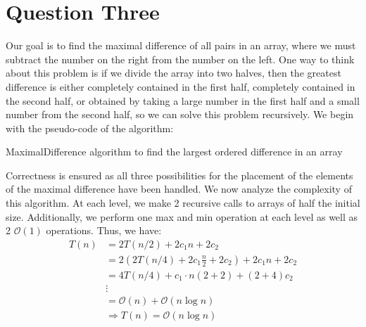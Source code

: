 \documentclass[11pt,letterpaper]{article}
\begin{document}
\section*{Question Three}
Our goal is to find the maximal difference of all pairs in an array, where we must subtract the number on the right from the number on the left. One way to think about this problem is if we divide the array into two halves, then the greatest difference is either completely contained in the first half, completely contained in the second half, or obtained by taking a large number in the first half and a small number from the second half, so we can solve this problem recursively. We begin with the pseudo-code of the algorithm:

\begin{algorithm}
	\caption{MaximalDifference algorithm to find the largest ordered difference in an array}
\end{algorithm}

Correctness is ensured as all three possibilities for the placement of the elements of the maximal difference have been handled. We now analyze the complexity of this algorithm. At each level, we make 2 recursive calls to arrays of half the initial size. Additionally, we perform one max and min operation at each level as well as 2 $\mathcal{O}(1)$ operations. Thus, we have:
\begin{align*}
	T(n) &= 2T(n/2) + 2 c_1 n + 2 c_2 \\
	&= 2(2T(n/4) + 2 c_1 \frac{n}{2} + 2 c_2) + 2 c_1 n + 2 c_2 \\
	&= 4 T(n/4) + c_1\cdot n (2 + 2) + (2 + 4)c_2 \\
	&\vdots \\
	&= \mathcal{O}(n) + \mathcal{O}(n \log n) \\
	&\Rightarrow T(n) = \mathcal{O}(n \log n)
\end{align*}
\end{document}
